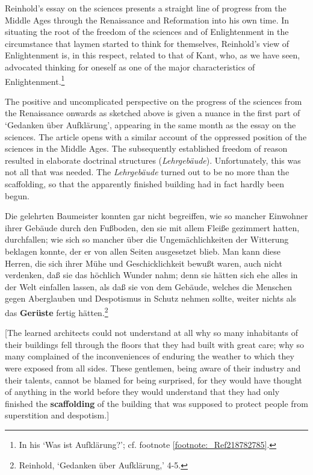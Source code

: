 Reinhold's essay on the sciences presents a straight line of progress from the Middle Ages through the Renaissance and Reformation into his own time. In situating the root of the freedom of the sciences and of Enlightenment in the circumstance that laymen started to think for themselves, Reinhold's view of Enlightenment is, in this respect, related to that of Kant, who, as we have seen, advocated thinking for oneself as one of the major characteristics of Enlightenment.\footnote{ In his `Was ist Aufkl\"{a}rung?'; cf. footnote \ref{footnote:_Ref218782785}.}

The positive and uncomplicated perspective on the progress of the sciences from the Renaissance onwards as sketched above is given a nuance in the first part of `Gedanken \"{u}ber Aufkl\"{a}rung', appearing in the same month as the essay on the sciences. The article opens with a similar account of the oppressed position of the sciences in the Middle Ages. The subsequently established freedom of reason resulted in elaborate doctrinal structures (\textit{Lehrgeb\"{a}ude}). Unfortunately, this was not all that was needed. The \textit{Lehrgeb\"{a}ude} turned out to be no more than the scaffolding, so that the apparently finished building had in fact hardly been begun. 

Die gelehrten Baumeister konnten gar nicht begreiffen, wie so mancher Einwohner ihrer Geb\"{a}ude durch den Fu\ss{}boden, den sie mit allem Flei\ss{}e gezimmert hatten, durchfallen; wie sich so mancher \"{u}ber die Ungem\"{a}chlichkeiten der Witterung beklagen konnte, der er von allen Seiten ausgesetzet blieb. Man kann diese Herren, die sich ihrer M\"{u}he und Geschicklichkeit bewu\ss{}t waren, auch nicht verdenken, da\ss{} sie das h\"{o}chlich Wunder nahm; denn sie h\"{a}tten sich ehe alles in der Welt einfallen lassen, als da\ss{} sie von dem Geb\"{a}ude, welches die Menschen gegen Aberglauben und Despotismus in Schutz nehmen sollte, weiter nichts als das \textbf{Ger\"{u}ste} fertig h\"{a}tten.\footnote{ Reinhold, `Gedanken \"{u}ber Aufkl\"{a}rung,' 4{-}5.} 

[The learned architects could not understand at all why so many inhabitants of their buildings fell through the floors that they had built with great care; why so many complained of the inconveniences of enduring the weather to which they were exposed from all sides. These gentlemen, being aware of their industry and their talents, cannot be blamed for being surprised, for they would have thought of anything in the world before they would understand that they had only finished the \textbf{scaffolding} of the building that was supposed to protect people from superstition and despotism.]

